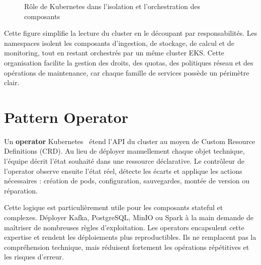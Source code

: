 \begin{figure}[H]
\centering
{}
\caption{Rôle de Kubernetes dans l'isolation et l'orchestration des composants}
\label{fig:kubernetes-cloud-native}
\end{figure}

Cette figure simplifie la lecture du cluster en le découpant par responsabilités. Les namespaces isolent les composants d'ingestion, de stockage, de calcul et de monitoring, tout en restant orchestrés par un même cluster EKS. Cette organisation facilite la gestion des droits, des quotas, des politiques réseau et des opérations de maintenance, car chaque famille de services possède un périmètre clair.

\section{Pattern Operator}

Un \textbf{operator} Kubernetes~\cite{kubernetes-operator-pattern} étend l'API du cluster au moyen de Custom Resource Definitions (CRD). Au lieu de déployer manuellement chaque objet technique, l'équipe décrit l'état souhaité dans une ressource déclarative. Le contrôleur de l'operator observe ensuite l'état réel, détecte les écarts et applique les actions nécessaires : création de pods, configuration, sauvegardes, montée de version ou réparation.

Cette logique est particulièrement utile pour les composants stateful et complexes. Déployer Kafka, PostgreSQL, MinIO ou Spark à la main demande de maîtriser de nombreuses règles d'exploitation. Les operators encapsulent cette expertise et rendent les déploiements plus reproductibles. Ils ne remplacent pas la compréhension technique, mais réduisent fortement les opérations répétitives et les risques d'erreur.

